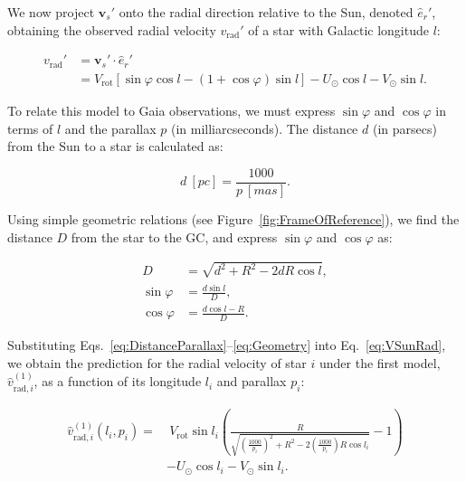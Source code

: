 We now project $\bm{v}_s'$ onto the radial direction relative to the Sun, denoted $\hat{e}_r'$, obtaining the observed radial velocity $v_{\text{rad}}'$ of a star with Galactic longitude $l$:

\begin{equation}\label{eq:VSunRad}
    \begin{aligned}
        v_{\text{rad}}' &= \bm{v}_s' \cdot \hat{e}_r' \\
        &= V_{\text{rot}} \left[ \sin\varphi \cos l - (1 + \cos\varphi)\sin l \right] - U_{\odot} \cos l - V_{\odot} \sin l.
    \end{aligned}
\end{equation}

To relate this model to Gaia observations, we must express $\sin\varphi$ and $\cos\varphi$ in terms of $l$ and the parallax $p$ (in milliarcseconds). The distance $d$ (in parsecs) from the Sun to a star is calculated as:

\begin{equation}\label{eq:DistanceParallax}
    d~[\unit{pc}] = \frac{1000}{p~[\unit{mas}]}.
\end{equation}

Using simple geometric relations (see Figure~\ref{fig:FrameOfReference}), we find the distance $D$ from the star to the GC, and express $\sin\varphi$ and $\cos\varphi$ as:

\begin{equation}\label{eq:Geometry}
    \begin{aligned}
        D &= \sqrt{d^2 + R^2 - 2dR \cos l}, \\
        \sin\varphi &= \frac{d \sin l}{D}, \\
        \cos\varphi &= \frac{d \cos l - R}{D}.
    \end{aligned}
\end{equation}

Substituting Eqs.~\ref{eq:DistanceParallax}--\ref{eq:Geometry} into Eq.~\ref{eq:VSunRad}, we obtain the prediction for the radial velocity of star $i$ under the first model, $\hat{v}_{\text{rad},i}^{(1)}$, as a function of its longitude $l_i$ and parallax $p_i$:

\begin{equation}\label{eq:VradModel1}
    \begin{aligned}
        \hat{v}_{\text{rad},i}^{(1)}(l_i, p_i) = &~V_{\text{rot}} \sin l_i \left( \frac{R}{\sqrt{\left(\frac{1000}{p_i}\right)^2 + R^2 - 2 \left(\frac{1000}{p_i}\right) R \cos l_i}} - 1 \right) \\
        &- U_{\odot} \cos l_i - V_{\odot} \sin l_i.
    \end{aligned}
\end{equation}

